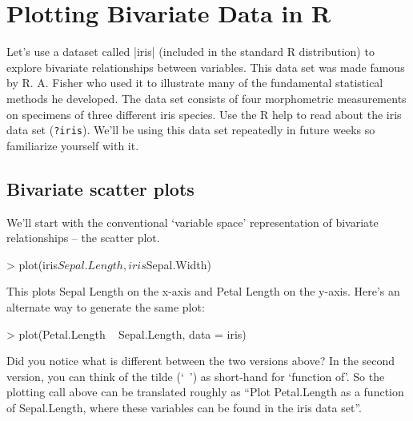 \section{Plotting Bivariate Data in R}


Let's use a dataset called |iris| (included in the standard R distribution) to explore bivariate relationships between variables. This data set was made famous by R. A. Fisher who used it to illustrate many of the fundamental statistical methods he developed. The data set consists of four morphometric measurements on specimens of three different iris species. Use the R help to read about the iris data set (\lstinline!?iris!). We'll be using this data set repeatedly in future weeks so familiarize yourself with it.
%


\subsection{Bivariate scatter plots}
We'll start with the conventional `variable space' representation of bivariate relationships -- the scatter plot.
%
\begin{R}
> plot(iris$Sepal.Length, iris$Sepal.Width)
\end{R}
%
This plots Sepal Length on the x-axis and Petal Length on the y-axis. Here's an alternate way to generate the same plot:
%
\begin{R}
> plot(Petal.Length ~ Sepal.Length, data = iris)
\end{R}
%
Did you notice what is different between the two versions above?  In the second version, you can think of the tilde (`~') as short-hand for `function of'.  So the plotting call above can be translated roughly as ``Plot Petal.Length as a function of Sepal.Length, where these variables can be found in the iris data set''.

